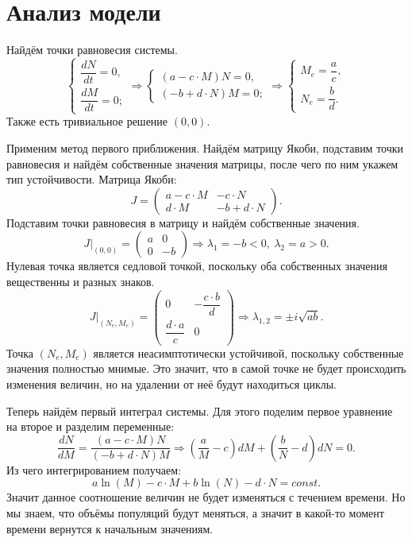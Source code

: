 \section{Анализ модели}
    Найдём точки равновесия системы.
    \[
        \begin{cases}
            \dfrac{dN}{dt} = 0, \\[.5em]
            \dfrac{dM}{dt} = 0;
        \end{cases}
        \Rightarrow
        \begin{cases}
            (a - c \cdot M) N = 0, \\[.5em]
            (-b + d \cdot N) M = 0;
        \end{cases}
        \Rightarrow
        \begin{cases}
            M_e = \dfrac{a}{c}, \\[.5em]
            N_e = \dfrac{b}{d}.
        \end{cases}
    \]
    Также есть тривиальное решение $ (0, 0) $.

    Применим метод первого приближения. Найдём матрицу Якоби, подставим точки равновесия и найдём собственные значения матрицы, после чего по ним укажем тип устойчивости.
    Матрица Якоби:
    \[
        J = \left(\begin{matrix}
            a - c \cdot M & -c \cdot N \\
            d \cdot M & -b + d \cdot N
        \end{matrix}\right).
    \]
    Подставим точки равновесия в матрицу и найдём собственные значения.
    \[
        J\big|_{(0,0)} = \left(\begin{matrix}
            a & 0\\
            0 & -b
        \end{matrix}\right)
        \Rightarrow
        \lambda_1 = -b < 0, ~ \lambda_2 = a > 0.
    \]
    Нулевая точка является седловой точкой, поскольку оба собственных значения вещественны и разных знаков.
    \[
        J\big|_{(N_e,M_e)} = \left(\begin{matrix}
            0 & -\dfrac{c \cdot b}{d}\\
            \dfrac{d \cdot a}{c} & 0
        \end{matrix}\right)
        \Rightarrow
        \lambda_{1,2} = \pm i \sqrt{ab}.
    \]
    Точка $ (N_e, M_e) $ является неасимптотически устойчивой, поскольку собственные значения полностью мнимые. Это значит, что в самой точке не будет происходить изменения величин, но на удалении от неё будут находиться циклы.

    Теперь найдём первый интеграл системы. Для этого поделим первое уравнение на второе и разделим переменные:
    \[
        \frac{dN}{dM} = \frac{(a - c \cdot M)N}{(-b + d \cdot N)M} \Rightarrow
        \left( \frac{a}{M} - c \right)dM + \left( \frac{b}{N} - d \right)dN = 0.
    \]
    Из чего интегрированием получаем:
    \[
        a \ln(M) - c \cdot M + b \ln(N) - d \cdot N = const.
    \]
    Значит данное соотношение величин не будет изменяться с течением времени. Но мы знаем, что объёмы популяций будут меняться, а значит в какой-то момент времени вернутся к начальным значениям.